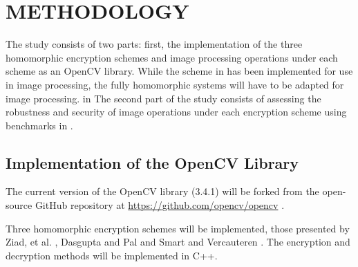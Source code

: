 \chapter{METHODOLOGY}

The study consists of two parts: first, the implementation of the three homomorphic encryption schemes \cite{ziad_cryptoimg:_2016, dasgupta_design_2016, hutchison_fully_2010} and image processing operations under each scheme as an OpenCV library. While the scheme in \cite{ziad_cryptoimg:_2016} has been implemented for use in image processing, the fully homomorphic systems \cite{dasgupta_design_2016, hutchison_fully_2010} will have to be adapted for image processing. in The second part of the study consists of assessing the robustness and security of image operations under each encryption scheme using benchmarks in \cite{ahmed_benchmark_2016}.

\section{Implementation of the OpenCV Library}

The current version of the OpenCV library (3.4.1) will be forked from the open-source GitHub repository at \url{https://github.com/opencv/opencv} \cite{bradski_opencv_2000}.

Three homomorphic encryption schemes will be implemented, those presented by Ziad, et al. \cite{ziad_cryptoimg:_2016}, Dasgupta and Pal \cite{dasgupta_design_2016} and Smart and Vercauteren \cite{hutchison_fully_2010}. The encryption and decryption methods will be implemented in C++.

